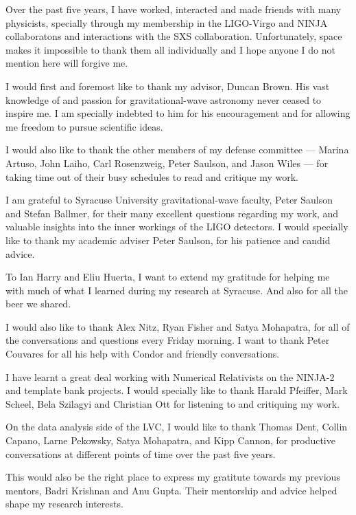 
Over the past five years, I have worked, interacted and made friends with many 
physicists, specially through my membership in the LIGO-Virgo and NINJA
collaboratons and interactions with the SXS collaboration.
Unfortunately, space makes it impossible to thank them all
individually and I hope anyone I do not mention here will forgive me.

\noindent I would first and foremost like to thank my advisor, Duncan Brown. His vast
knowledge of and passion for gravitational-wave astronomy never ceased to 
inspire me. I am specially indebted to him for his encouragement and for
allowing me freedom to pursue scientific ideas.


\noindent I would also like to thank the other members of my defense committee --- Marina
Artuso, John Laiho, Carl Rosenzweig, Peter Saulson, and Jason Wiles ---
for taking time out of their busy schedules to read and critique my work.


\noindent I am grateful to Syracuse University gravitational-wave faculty,
Peter Saulson and Stefan Ballmer, for their many excellent questions 
regarding my work, and valuable insights into the inner workings of the 
LIGO detectors. I would specially like to thank my academic adviser Peter
Saulson, for his patience and candid advice.


\noindent To Ian Harry and Eliu Huerta, I want to extend my gratitude for helping
me with much of what I learned during my research at Syracuse. And also for 
all the beer we shared.


\noindent I would also like to thank Alex Nitz, Ryan Fisher and Satya Mohapatra,
for all of the conversations and questions every Friday morning. I want to thank
Peter Couvares for all his help with Condor and friendly conversations.


\noindent I have learnt a great deal working with Numerical Relativists on the NINJA-2
and template bank projects. I would specially like to thank Harald Pfeiffer, 
Mark Scheel, Bela Szilagyi and Christian Ott for listening to and critiquing
my work.


\noindent On the data analysis side of the LVC, I would like to thank Thomas Dent, 
Collin Capano, Larne Pekowsky, Satya Mohapatra, and Kipp Cannon, 
for productive conversations at different points of time over the past five years.


\noindent This would also be the right place to express my gratitute towards
my previous mentors, Badri Krishnan and Anu Gupta. Their mentorship and advice
helped shape my research interests.


